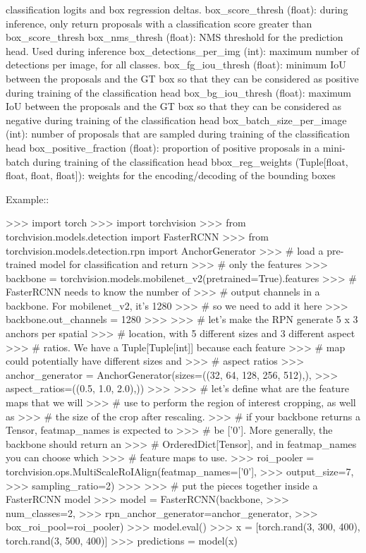 \begin{DoxyVerb}
        classification logits and box regression deltas.
    box_score_thresh (float): during inference, only return proposals with a classification score
        greater than box_score_thresh
    box_nms_thresh (float): NMS threshold for the prediction head. Used during inference
    box_detections_per_img (int): maximum number of detections per image, for all classes.
    box_fg_iou_thresh (float): minimum IoU between the proposals and the GT box so that they can be
        considered as positive during training of the classification head
    box_bg_iou_thresh (float): maximum IoU between the proposals and the GT box so that they can be
        considered as negative during training of the classification head
    box_batch_size_per_image (int): number of proposals that are sampled during training of the
        classification head
    box_positive_fraction (float): proportion of positive proposals in a mini-batch during training
        of the classification head
    bbox_reg_weights (Tuple[float, float, float, float]): weights for the encoding/decoding of the
        bounding boxes

Example::

    >>> import torch
    >>> import torchvision
    >>> from torchvision.models.detection import FasterRCNN
    >>> from torchvision.models.detection.rpn import AnchorGenerator
    >>> # load a pre-trained model for classification and return
    >>> # only the features
    >>> backbone = torchvision.models.mobilenet_v2(pretrained=True).features
    >>> # FasterRCNN needs to know the number of
    >>> # output channels in a backbone. For mobilenet_v2, it's 1280
    >>> # so we need to add it here
    >>> backbone.out_channels = 1280
    >>>
    >>> # let's make the RPN generate 5 x 3 anchors per spatial
    >>> # location, with 5 different sizes and 3 different aspect
    >>> # ratios. We have a Tuple[Tuple[int]] because each feature
    >>> # map could potentially have different sizes and
    >>> # aspect ratios
    >>> anchor_generator = AnchorGenerator(sizes=((32, 64, 128, 256, 512),),
    >>>                                    aspect_ratios=((0.5, 1.0, 2.0),))
    >>>
    >>> # let's define what are the feature maps that we will
    >>> # use to perform the region of interest cropping, as well as
    >>> # the size of the crop after rescaling.
    >>> # if your backbone returns a Tensor, featmap_names is expected to
    >>> # be ['0']. More generally, the backbone should return an
    >>> # OrderedDict[Tensor], and in featmap_names you can choose which
    >>> # feature maps to use.
    >>> roi_pooler = torchvision.ops.MultiScaleRoIAlign(featmap_names=['0'],
    >>>                                                 output_size=7,
    >>>                                                 sampling_ratio=2)
    >>>
    >>> # put the pieces together inside a FasterRCNN model
    >>> model = FasterRCNN(backbone,
    >>>                    num_classes=2,
    >>>                    rpn_anchor_generator=anchor_generator,
    >>>                    box_roi_pool=roi_pooler)
    >>> model.eval()
    >>> x = [torch.rand(3, 300, 400), torch.rand(3, 500, 400)]
    >>> predictions = model(x)
\end{DoxyVerb}
 

